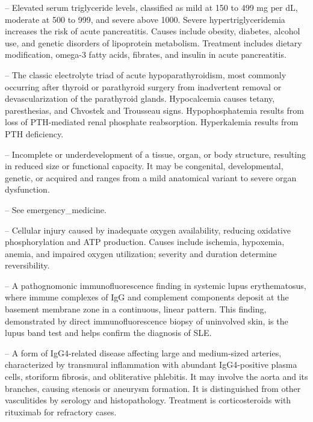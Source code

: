 -- Elevated serum triglyceride levels, classified as mild at 150 to 499 mg per dL, moderate at 500 to 999, and severe above 1000. Severe hypertriglyceridemia increases the risk of acute pancreatitis. Causes include obesity, diabetes, alcohol use, and genetic disorders of lipoprotein metabolism. Treatment includes dietary modification, omega-3 fatty acids, fibrates, and insulin in acute pancreatitis.

-- The classic electrolyte triad of acute hypoparathyroidism, most commonly occurring after thyroid or parathyroid surgery from inadvertent removal or devascularization of the parathyroid glands. Hypocalcemia causes tetany, paresthesias, and Chvostek and Trousseau signs. Hypophosphatemia results from loss of PTH-mediated renal phosphate reabsorption. Hyperkalemia results from PTH deficiency.

-- Incomplete or underdevelopment of a tissue, organ, or body structure, resulting in reduced size or functional capacity. It may be congenital, developmental, genetic, or acquired and ranges from a mild anatomical variant to severe organ dysfunction.

-- See emergency\_medicine.

-- Cellular injury caused by inadequate oxygen availability, reducing oxidative phosphorylation and ATP production. Causes include ischemia, hypoxemia, anemia, and impaired oxygen utilization; severity and duration determine reversibility.

-- A pathognomonic immunofluorescence finding in systemic lupus erythematosus, where immune complexes of IgG and complement components deposit at the basement membrane zone in a continuous, linear pattern. This finding, demonstrated by direct immunofluorescence biopsy of uninvolved skin, is the lupus band test and helps confirm the diagnosis of SLE.

-- A form of IgG4-related disease affecting large and medium-sized arteries, characterized by transmural inflammation with abundant IgG4-positive plasma cells, storiform fibrosis, and obliterative phlebitis. It may involve the aorta and its branches, causing stenosis or aneurysm formation. It is distinguished from other vasculitides by serology and histopathology. Treatment is corticosteroids with rituximab for refractory cases.

